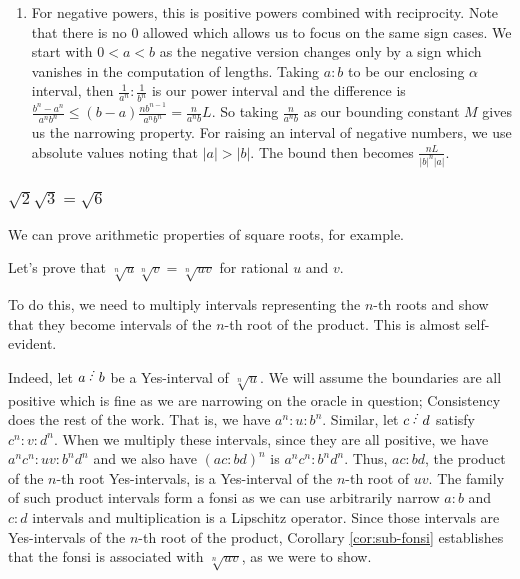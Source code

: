 \documentclass[12pt]{article}
\begin{document}
\begin{enumerate}
    \item For negative powers, this is positive powers combined with reciprocity. Note that there is no 0 allowed which allows us to focus on the same sign cases. We start with $0 < a < b$ as the negative version changes only by a sign which vanishes in the computation of lengths.  Taking $a:b$ to be our enclosing $\alpha$ interval, then $\frac{1}{a^n} : \frac{1}{b^n}$ is our power interval and the difference is $\frac{b^n-a^n}{a^n b^n} \leq (b-a) \frac{n b^{n-1}}{a^n b^n} = \frac{n}{a^n b} L$. So taking $\frac{n}{a^n b}$ as our bounding constant $M$ gives us the narrowing property.  For raising an interval of negative numbers, we use absolute values noting that  $|a|>|b|$. The bound then becomes $\frac{nL}{|b|^n |a|}$.
\end{enumerate}

\subsubsection{\texorpdfstring{$\sqrt{2} \sqrt{3} = \sqrt{6}$}{sqrt2sqrt3eqsqrt6}}

We can prove arithmetic properties of square roots, for example. 

Let's prove that $\sqrt[n]{u} \sqrt[n]{v} = \sqrt[n]{uv}$  for rational $u$ and $v$. 

To do this, we need to multiply intervals representing the $n$-th roots and show that they become intervals of the $n$-th root of the product. This is almost self-evident. 

Indeed, let $a\lte b$ be a Yes-interval of $\sqrt[n]{u}$. We will assume the boundaries are all positive which is fine as we are narrowing on the oracle in question; Consistency does the rest of the work. That is, we have $a^n:u:b^n$.  Similar, let $c \lte d$ satisfy $c^n : v : d^n$. When we multiply these intervals, since they are all positive, we have $a^n c^n : uv : b^n d^n$ and we also have $(ac:bd)^n$ is $a^n c^n : b^n d^n$. Thus, $ac:bd$, the product of the $n$-th root Yes-intervals, is a Yes-interval of the $n$-th root of $uv$. The family of such product intervals form a fonsi as we can use arbitrarily narrow $a:b$ and $c:d$ intervals and multiplication is a Lipschitz operator. Since those intervals are Yes-intervals of the $n$-th root of the product, Corollary \ref{cor:sub-fonsi} establishes that the fonsi is associated with $\sqrt[n]{uv}$, as we were to show. 
\end{document}
